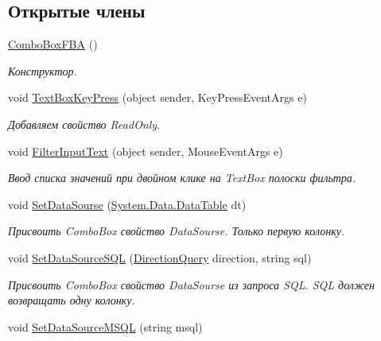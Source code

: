 \subsection*{Открытые члены}
\begin{DoxyCompactItemize}
\item 
\mbox{\hyperlink{class_f_b_a_1_1_combo_box_f_b_a_ad9047eb958e2393f895fae537fdde597}{Combo\+Box\+F\+BA}} ()
\begin{DoxyCompactList}\small\item\em Конструктор. \end{DoxyCompactList}\item 
void \mbox{\hyperlink{class_f_b_a_1_1_combo_box_f_b_a_a29ebc5310e5b4560ba23df57750b86f8}{Text\+Box\+Key\+Press}} (object sender, Key\+Press\+Event\+Args e)
\begin{DoxyCompactList}\small\item\em Добавляем свойство Read\+Only. \end{DoxyCompactList}\item 
void \mbox{\hyperlink{class_f_b_a_1_1_combo_box_f_b_a_a3c00e477f47e26bdaad144eeb0e1ca07}{Filter\+Input\+Text}} (object sender, Mouse\+Event\+Args e)
\begin{DoxyCompactList}\small\item\em Ввод списка значений при двойном клике на Text\+Box полоски фильтра. \end{DoxyCompactList}\item 
void \mbox{\hyperlink{class_f_b_a_1_1_combo_box_f_b_a_a61ec493c9048c621039d59291ba1358f}{Set\+Data\+Sourse}} (\mbox{\hyperlink{_sys_static_8cs_a6542cfcff2f8e81f06ade15aa0bfe2b7}{System.\+Data.\+Data\+Table}} dt)
\begin{DoxyCompactList}\small\item\em Присвоить Combo\+Box свойство Data\+Sourse. Только первую колонку. \end{DoxyCompactList}\item 
void \mbox{\hyperlink{class_f_b_a_1_1_combo_box_f_b_a_a9d73862972c0b9003232a0f7cbb3a061}{Set\+Data\+Source\+S\+QL}} (\mbox{\hyperlink{namespace_f_b_a_a6ff7d5c242d98046d1980715b06d7300}{Direction\+Query}} direction, string sql)
\begin{DoxyCompactList}\small\item\em Присвоить Combo\+Box свойство Data\+Sourse из запроса S\+QL. S\+QL должен возвращать одну колонку. \end{DoxyCompactList}\item 
void \mbox{\hyperlink{class_f_b_a_1_1_combo_box_f_b_a_a9192d511b517c647cb71f364cdebfb6a}{Set\+Data\+Source\+M\+S\+QL}} (string msql)

\end{DoxyCompactItemize}
